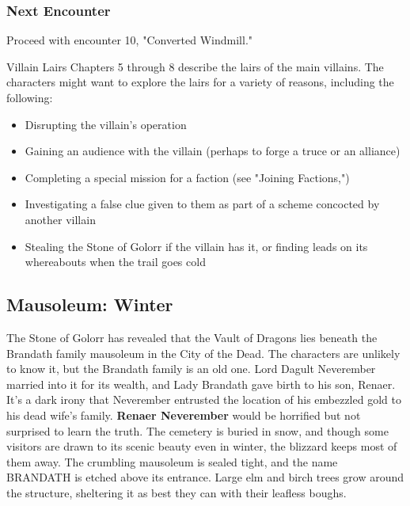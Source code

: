 \documentclass[10pt,a4paper,twoside,twocolumn,openany,nodeprecatedcode]{dndbook}
\begin{document}
\subsubsection{Next Encounter}
Proceed with encounter 10, "Converted Windmill."
\begin{DndComment}{Villain Lairs}
Chapters 5 through 8 describe the lairs of the main villains. The characters might want to explore the lairs for a variety of reasons, including the following:
\begin{itemize}

\item Disrupting the villain's operation
\item Gaining an audience with the villain (perhaps to forge a truce or an alliance)
\item Completing a special mission for a faction (see "Joining Factions,")
\item Investigating a false clue given to them as part of a scheme concocted by another villain
\item Stealing the Stone of Golorr if the villain has it, or finding leads on its whereabouts when the trail goes cold
\end{itemize}


\end{DndComment}

\subsection{Mausoleum: Winter}
The Stone of Golorr has revealed that the Vault of Dragons lies beneath the Brandath family mausoleum in the City of the Dead. The characters are unlikely to know it, but the Brandath family is an old one. Lord Dagult Neverember married into it for its wealth, and Lady Brandath gave birth to his son, Renaer. It's a dark irony that Neverember entrusted the location of his embezzled gold to his dead wife's family. \textbf{Renaer Neverember} would be horrified but not surprised to learn the truth.
The cemetery is buried in snow, and though some visitors are drawn to its scenic beauty even in winter, the blizzard keeps most of them away. The crumbling mausoleum is sealed tight, and the name BRANDATH is etched above its entrance. Large elm and birch trees grow around the structure, sheltering it as best they can with their leafless boughs.
\end{document}
